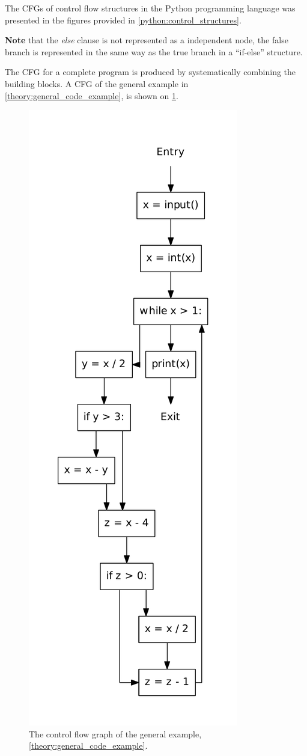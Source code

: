 The CFGs of  control flow structures in the Python programming language was presented in the figures provided in \cref{python:control_structures}.

\textbf{Note} that the \textit{else} clause is not represented as a independent node, the false branch is represented in the same way as the true branch in a ``if-else'' structure.

The CFG for a complete program is produced by systematically combining the building blocks.
A CFG of the general example in \cref{theory:general_code_example}, is shown on \cref{theory:general_code_example_cfg}.

\begin{figure}
  \center
  \includegraphics[width=.25\textwidth]{figures/general_example.pdf}
  \caption{The control flow graph of the general example, \cref{theory:general_code_example}.}
  \label{theory:general_code_example_cfg}
\end{figure}
